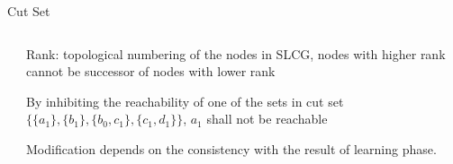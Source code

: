 \documentclass[8pt]{beamer}
\begin{document}
\begin{frame}{Cut Set}
    
    
    \vspace{0.5cm}
\begin{columns}
\begin{column}{0.62\textwidth}
    
\end{column}
\begin{column}{0.38\textwidth}

	\vspace{0.2cm}
    Rank: topological numbering of the nodes in SLCG, nodes with higher rank cannot be successor of nodes with lower rank
    
    \vspace{0.2cm}
    By inhibiting the reachability of one of the sets in cut set $\{\{a_1\},\{b_1\},\{b_0,c_1\},\{c_1,d_1\}\}$, $a_1$ shall not be reachable
    
    \vspace{0.2cm}
    Modification depends on the consistency with the result of learning phase.

\end{column}
\end{columns}    
\end{frame}
\end{document}
